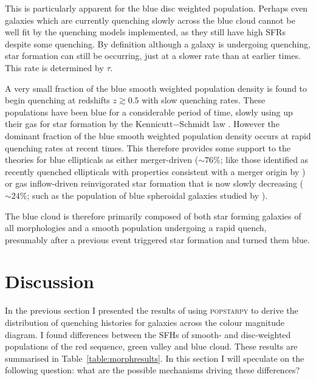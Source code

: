 This is particularly apparent for the blue disc weighted population. Perhaps even galaxies which are currently quenching slowly across the blue cloud cannot be well fit by the quenching models implemented, as they still have high SFRs despite some quenching. By definition although a galaxy is undergoing quenching, star formation can still be occurring, just at a slower rate than at earlier times. This rate is determined by $\tau$.

A very small fraction of the blue smooth weighted population density is found to begin quenching at redshifts $z \gtrsim 0.5 $ with slow quenching rates. These populations have been blue for a considerable period of time, slowly using up their gas for star formation by the Kennicutt$-$Schmidt law \citep{schmidt59, kennicutt97}. However the dominant fraction of the blue smooth weighted population density occurs at rapid quenching rates at recent times. This therefore provides some support to the theories for blue ellipticals as either merger-driven ($\sim76\%$; like those identified as recently quenched ellipticals with properties consistent with a merger origin by \citealt{McIntosh14}) or gas inflow-driven reinvigorated star formation that is now slowly decreasing ($\sim24\%$; such as the population of blue spheroidal galaxies studied by \citealt{Kaviraj13}).

The blue cloud is therefore primarily composed of both star forming galaxies of all morphologies and a smooth population undergoing a rapid quench, presumably after a previous event triggered star formation and turned them blue.


\section{Discussion}\label{morph:discussion}

In the previous section I presented the results of using \textsc{popstarpy} to derive the distribution of quenching histories for galaxies across the colour magnitude diagram. I  found differences between the SFHs of smooth- and disc-weighted populations of the red sequence, green valley and blue cloud. These results are summarised in Table~\ref{table:morphresults}. In this section I will speculate on the following question: what are the possible mechanisms driving these differences? 

